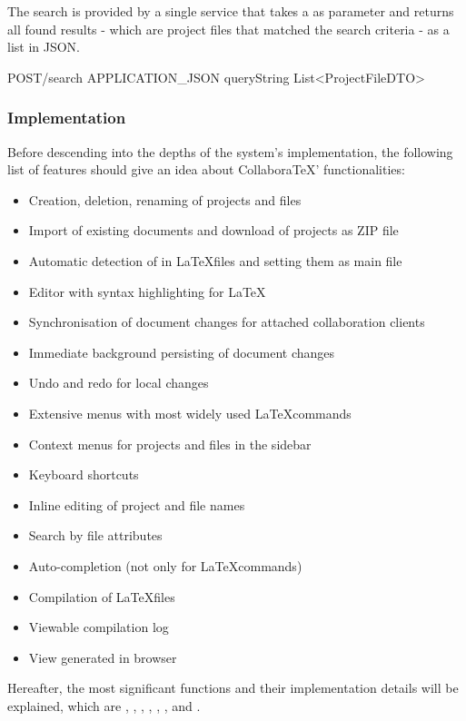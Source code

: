 
The search is provided by a single service that takes a  as parameter and returns all found results - which are project files that matched the search criteria - as a list in JSON. 

{POST}{/search}
{}{APPLICATION\_JSON}
{query}{String}
{List<ProjectFileDTO>}

\subsubsection{Implementation}
\label{subsubsec:collaboratex-implementation}
Before descending into the depths of the system's implementation, the following list of features should give an idea about CollaboraTeX' functionalities:

\begin{itemize}
	\item{Creation, deletion, renaming of projects and files}
	\item{Import of existing documents and download of projects as ZIP file}
	\item{Automatic detection of  in \LaTeX files and setting them as main file}
	\item{Editor with syntax highlighting for \LaTeX}
	\item{Synchronisation of document changes for attached collaboration clients}
	\item{Immediate background persisting of document changes}
	\item{Undo and redo for local changes}
	\item{Extensive menus with most widely used \LaTeX commands}
	\item{Context menus for projects and files in the sidebar}
	\item{Keyboard shortcuts}
	\item{Inline editing of project and file names}
	\item{Search by file attributes}
	\item{Auto-completion (not only for \LaTeX commands)}
	\item{Compilation of \LaTeX files}
	\item{Viewable compilation log}
	\item{View generated  in browser}
\end{itemize}

Hereafter, the most significant functions and their implementation details will be explained, which are , , , , , ,  and .

